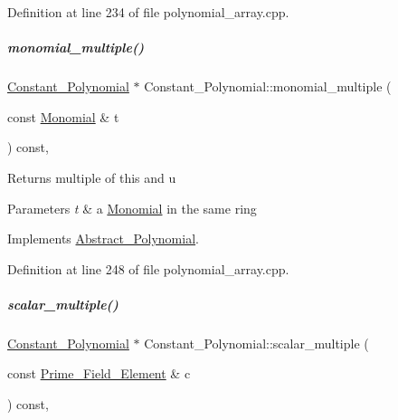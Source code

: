 Definition at line 234 of file polynomial\+\_\+array.\+cpp.

\mbox{\label{group__polygroup_ae0af1a1cf7c7eed390b25a951a685da2}} 
\subparagraph{\texorpdfstring{monomial\+\_\+multiple()}{monomial\_multiple()}}
{\footnotesize\ttfamily \hyperlink{group__polygroup_class_constant___polynomial}{Constant\+\_\+\+Polynomial} $\ast$ Constant\+\_\+\+Polynomial\+::monomial\+\_\+multiple (\begin{DoxyParamCaption}\item[{const \hyperlink{group__polygroup_class_monomial}{Monomial} \&}]{t }\end{DoxyParamCaption}) const\hspace{0.3cm}{\ttfamily [override]}, {\ttfamily [virtual]}}

\begin{DoxyReturn}{Returns}
multiple of {\ttfamily this} and {\ttfamily u} 
\end{DoxyReturn}

\begin{DoxyParams}{Parameters}
{\em t} & a \hyperlink{group__polygroup_class_monomial}{Monomial} in the same ring \\
\hline
\end{DoxyParams}


Implements \hyperlink{group__polygroup_aacee94ef63116201c91c7d65779097d8}{Abstract\+\_\+\+Polynomial}.



Definition at line 248 of file polynomial\+\_\+array.\+cpp.

\mbox{\label{group__polygroup_afd8bdd523c36fbde64df0bf36a0f4e77}} 
\subparagraph{\texorpdfstring{scalar\+\_\+multiple()}{scalar\_multiple()}}
{\footnotesize\ttfamily \hyperlink{group__polygroup_class_constant___polynomial}{Constant\+\_\+\+Polynomial} $\ast$ Constant\+\_\+\+Polynomial\+::scalar\+\_\+multiple (\begin{DoxyParamCaption}\item[{const \hyperlink{group___fields_group_class_prime___field___element}{Prime\+\_\+\+Field\+\_\+\+Element} \&}]{c }\end{DoxyParamCaption}) const\hspace{0.3cm}{\ttfamily [override]}, {\ttfamily [virtual]}}

